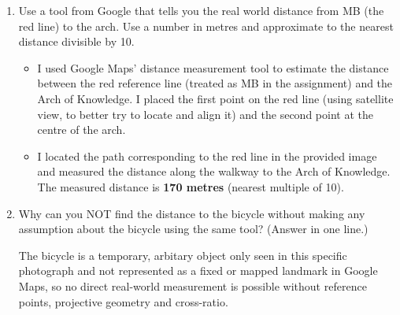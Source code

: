 \begin{enumerate}
\item Use a tool from Google that tells you the real world distance from MB (the red line) to the arch.  Use a number in metres and approximate to the nearest distance divisible by 10. 
\begin{studentSpace}
    \begin{itemize}
        \item I used Google Maps' distance measurement tool to estimate the distance between the red reference line (treated as MB in the assignment) and the Arch of Knowledge. I placed the first point on the red line (using satellite view, to better try to locate and align it) and the second point at the centre of the arch.
        \item I located the path corresponding to the red line in the provided image and measured the distance along the walkway to the Arch of Knowledge. The measured distance is \textbf{170 metres} (nearest multiple of 10).
    \end{itemize}
\end{studentSpace}

\item Why can you NOT find the distance to the bicycle without making any assumption about the bicycle using the same tool? (Answer in one line.)
\begin{studentSpace}

    The bicycle is a temporary, arbitary object only seen in this specific photograph and not represented as a fixed or mapped landmark in Google Maps, so no direct real-world measurement is possible without reference points, projective geometry and cross-ratio.
\end{studentSpace}


\end{enumerate}
